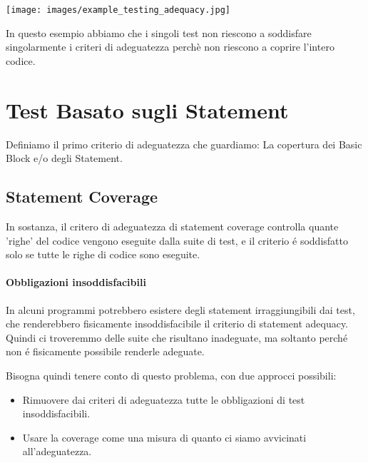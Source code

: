 \begin{center}
    \texttt{[image: images/example\_testing\_adequacy.jpg]}
\end{center}
In questo esempio abbiamo che i singoli test non riescono a soddisfare singolarmente i criteri di adeguatezza perchè non riescono a coprire l'intero codice.



\section{Test Basato sugli Statement}
Definiamo il primo criterio di adeguatezza che guardiamo: La copertura dei Basic Block e/o degli Statement.

\subsection{Statement Coverage}

In sostanza, il critero di adeguatezza di statement coverage controlla quante 'righe' del codice vengono eseguite dalla suite di test, e il criterio é soddisfatto solo se tutte le righe di codice sono eseguite.

\paragraph*{Obbligazioni insoddisfacibili}
In alcuni programmi potrebbero esistere degli statement irraggiungibili dai test, che renderebbero fisicamente insoddisfacibile il criterio di statement adequacy.
Quindi ci troveremmo delle suite che risultano inadeguate, ma soltanto perché non é fisicamente possibile renderle adeguate.

Bisogna quindi tenere conto di questo problema, con due approcci possibili:
\begin{itemize}
    \item Rimuovere dai criteri di adeguatezza tutte le obbligazioni di test insoddisfacibili.
    \item Usare la coverage come una misura di quanto ci siamo avvicinati all'adeguatezza.
\end{itemize}

